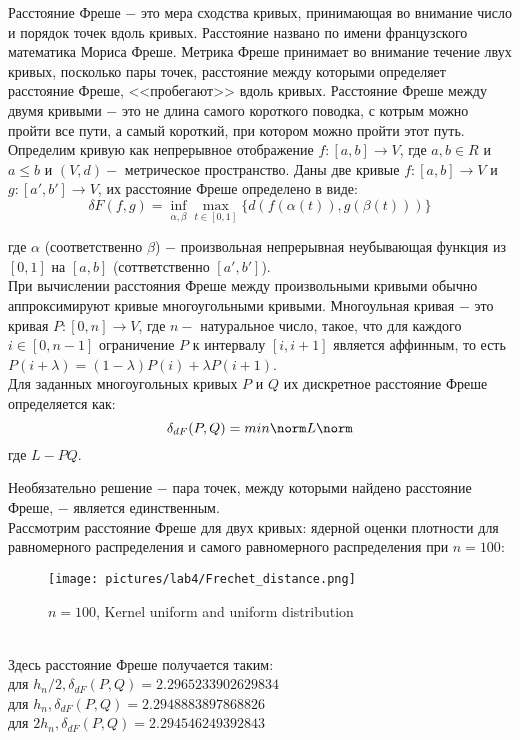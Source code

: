 \documentclass{article}
\begin{document}
Расстояние Фреше $-$ это мера сходства кривых, принимающая во внимание число и порядок точек вдоль кривых. Расстояние названо по имени французского математика Мориса Фреше.
Метрика Фреше принимает во внимание течение лвух кривых, посколько пары точек, расстояние между которыми определяет расстояние Фреше, <<пробегают>> вдоль кривых.
Расстояние Фреше между двумя кривыми $-$ это не длина самого короткого поводка, с котрым можно пройти все пути, а самый короткий, при котором можно пройти этот путь. \\

Определим кривую как непрерывное отображение $f: [a,b] \rightarrow V$, где $a, b \in R$ и $a \leq b$ и $(V,d) - $ метрическое пространство.
Даны две кривые $f: [a,b] \rightarrow V$ и $g: [a',b'] \rightarrow V$, их расстояние Фреше определено в виде:
\begin{equation}
    \delta F(f,g) = \inf_{\alpha, \beta}\max_{t \in [0,1]}{\{d(f(\alpha(t)), g(\beta(t)))\}}
\end{equation}

где $\alpha$ (соответственно $\beta$) $-$ произвольная непрерывная неубывающая функция из $[0, 1]$ на $[a, b]$ (соттветственно $[a',b']$). \\
При вычислении расстояния Фреше между произвольными кривыми обычно аппроксимируют кривые многоугольными кривыми. Многоульная кривая $-$ это кривая $P: [0,n] \rightarrow V$, где $n - $ натуральное число, такое, что для каждого $i \in [0,n-1]$ ограничение $P$ к интервалу $[i,i+1]$ является аффинным, то есть $P(i+\lambda) = (1-\lambda)P(i)+\lambda P(i+1)$. \\
Для заданных многоугольных кривых $P$ и $Q$ их дискретное расстояние Фреше определяется как:
\begin{equation}
    \delta_{dF}(P,Q)=min\norm L \norm
\end{equation}
где $L - PQ$.

Необязательно решение $ - $ пара точек, между которыми найдено расстояние Фреше, $-$ является единственным. \\

Рассмотрим расстояние Фреше для двух кривых: ядерной оценки плотности для равномерного распределения и самого равномерного распределения при $n=100$:

\begin{figure}[ht]
	\centering
	\texttt{[image: pictures/lab4/Frechet\_distance.png]}
	\caption{$n = 100$, Kernel uniform and uniform distribution}
	\label{Frechet_dist}
\end{figure}
\\
Здесь расстояние Фреше получается таким:\\
для $h_n/2, \delta_{dF}(P,Q) = 2.2965233902629834$ \\
для $h_n, \delta_{dF}(P,Q) = 2.2948883897868826$ \\
для $2h_n, \delta_{dF}(P,Q) = 2.294546249392843$ \\
\end{document}
